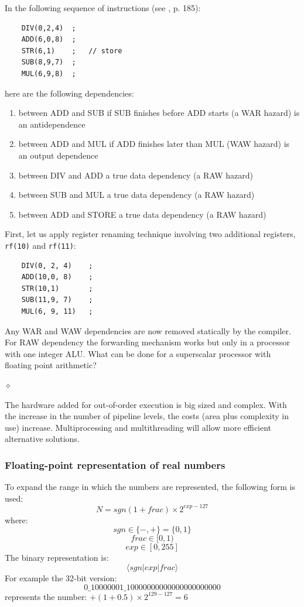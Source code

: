\begin{exemplu}\label{warwaw}
In the following sequence of instructions (see \citep{Patterson05}, p. 185):
\begin{verbatim}
    DIV(0,2,4)  ;
    ADD(6,0,8)  ;
    STR(6,1)    ;   // store
    SUB(8,9,7)  ;
    MUL(6,9,8)  ;
\end{verbatim}
here are the following dependencies:
\begin{enumerate}
    \item between ADD and SUB if SUB finishes before ADD starts (a WAR hazard) is an antidependence
    \item between ADD and MUL if ADD finishes later than MUL (WAW hazard) is an output dependence
    \item between DIV and ADD a true data dependency (a RAW hazard)
    \item between SUB and MUL a true data dependency (a RAW hazard)
    \item between ADD and STORE a true data dependency (a RAW hazard)
\end{enumerate}
First, let us apply register renaming technique involving two additional registers, {\tt rf(10)} and {\tt rf(11)}:
\begin{verbatim}
    DIV(0, 2, 4)    ;
    ADD(10,0, 8)    ;
    STR(10,1)       ;
    SUB(11,9, 7)    ;
    MUL(6, 9, 11)   ;
\end{verbatim}
Any WAR and WAW dependencies are now removed statically by the compiler. For RAW dependency the forwarding mechanism works but only in a processor with one integer ALU. What can be done for a superscalar processor with floating point arithmetic?

$\diamond$
\end{exemplu}

The hardware added for out-of-order execution is big sized and complex. With the increase in the number of pipeline levels, the costs (area plus complexity in use) increase. Multiprocessing and multithreading will allow more efficient alternative solutions.

\subsubsection{Floating-point representation of real numbers}

To expand the range in which the numbers are represented, the following form is used:
$$N = sgn(1 + frac) \times 2^{exp - 127}$$
where:
$$sgn \in \{-,+\} = \{0,1\}$$
$$frac \in [0, 1)$$
$$exp \in [0,255]$$
The binary representation is:
$$\langle sgn | exp | frac \rangle$$
For example the 32-bit version:
$$0\_10000001\_10000000000000000000000$$
represents the number: $+ (1+0.5) \times 2^{129-127} = 6$


